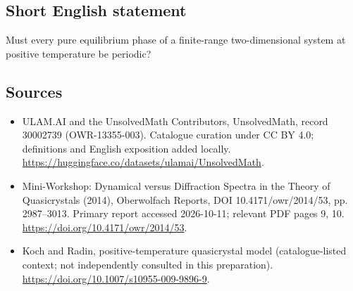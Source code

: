 \documentclass[11pt]{article}
\begin{document}
\subsection{Short English statement}
Must every pure equilibrium phase of a finite-range two-dimensional system at positive temperature be periodic?
\subsection{Sources}
\begin{itemize}
\item[\hypertarget{source:30002739:1}{S1}] ULAM.AI and the UnsolvedMath Contributors, UnsolvedMath, record 30002739 (OWR-13355-003). Catalogue curation under CC BY 4.0; definitions and English exposition added locally.
\url{https://huggingface.co/datasets/ulamai/UnsolvedMath}.
\item[\hypertarget{source:30002739:2}{S2}] Mini-Workshop: Dynamical versus Diffraction Spectra in the Theory of Quasicrystals (2014), Oberwolfach Reports, DOI 10.4171/owr/2014/53, pp. 2987--3013. Primary report accessed 2026-10-11; relevant PDF pages 9, 10.
\url{https://doi.org/10.4171/owr/2014/53}.
\item[\hypertarget{source:30002739:3}{S3}] Koch and Radin, positive-temperature quasicrystal model (catalogue-listed context; not independently consulted in this preparation).
\url{https://doi.org/10.1007/s10955-009-9896-9}.
\end{itemize}
\label{end:30002739}
\end{document}
